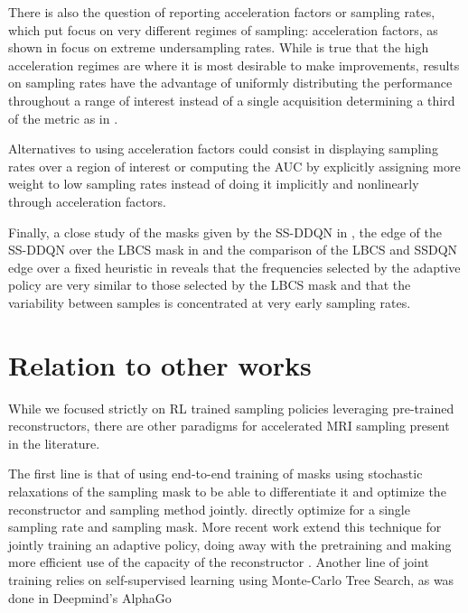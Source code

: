 There is also the question of reporting acceleration factors or sampling rates, which put focus on very different regimes of sampling: acceleration factors, as shown in \cite{pineda2020active} focus on extreme undersampling rates. %
While is true that the high acceleration regimes are where it is most desirable to make improvements, results on sampling rates have the advantage of uniformly distributing the performance throughout a range of interest instead of a single acquisition determining a third of the metric as in .

Alternatives to using acceleration factors could consist in displaying sampling rates over a region of interest or computing the AUC by explicitly assigning more weight to low sampling rates instead of doing it implicitly and nonlinearly through acceleration factors.

Finally, a close study of the masks given by the SS-DDQN in , the edge of the SS-DDQN over the LBCS mask in  and the comparison of the LBCS and SSDQN edge over a fixed heuristic in  reveals that the frequencies selected by the adaptive policy are very similar to those selected by the LBCS mask and that the variability between samples is concentrated at very early sampling rates.

\section{Relation to other works}
While we focused strictly on RL trained sampling policies leveraging pre-trained reconstructors, there are other paradigms for accelerated MRI sampling present in the literature.

The first line is that of using end-to-end training of masks using stochastic relaxations of the sampling mask to be able to differentiate it and optimize the reconstructor and sampling method jointly.  \citet{bahadir2019learning, huijben2020learning} directly optimize for a single sampling rate and sampling mask. More recent work extend this technique for jointly training an adaptive policy, doing away with the pretraining and making more efficient use of the capacity of the reconstructor  \citep{yin2021end,van2021active}. Another line of joint training relies on self-supervised learning using Monte-Carlo Tree Search, as was done in Deepmind's AlphaGo \citep{silver2017mastering,jin2019self}

